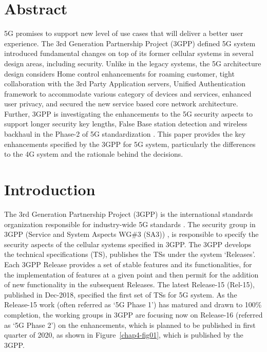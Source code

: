 \begin{multicols}{2}

\section*{Abstract}

5G promises to support new level of use cases that will deliver a better user experience. The 3rd Generation Partnership Project (3GPP) \cite{art4-key01} defined 5G system introduced fundamental changes on top of its former cellular systems in several design areas, including security. Unlike in the legacy systems, the 5G architecture design considers Home control enhancements for roaming customer, tight collaboration with the 3rd Party Application servers, Unified Authentication framework to accommodate various category of devices and services, enhanced user privacy, and secured the new service based core network architecture. Further, 3GPP is investigating the enhancements to the 5G security aspects to support longer security key lengths, False Base station detection and wireless backhaul in the Phase-2 of 5G standardization \cite{art4-key02}. This paper provides the key enhancements specified by the 3GPP for 5G system, particularly the differences to the 4G system and the rationale behind the decisions.

\section{Introduction}

The 3rd Generation Partnership Project (3GPP) is the international standards organization responsible for industry-wide 5G standards \cite{art4-key01}. The security group in 3GPP (Service and System Aspects WG\#3 (SA3)) \cite{art4-key02}, is responsible to specify the security aspects of the cellular systems specified in 3GPP. The 3GPP develops the technical specifications (TS), publishes the TSs under the system ‘Releases’. Each 3GPP Release provides a set of stable features and its functionalities, for the implementation of features at a given point and then permit for the addition of new functionality in the subsequent Releases. The latest Release-15 (Rel-15), published in Dec-2018, specified the first set of TSs for 5G system. As the Release-15 work (often referred as ‘5G Phase 1’) has matured and drawn to 100\% completion, the working groups in 3GPP are focusing now on Release-16 (referred as ‘5G Phase 2’) on the enhancements, which is planned to be published in first quarter of 2020, as shown in Figure~\ref{chap4-fig01}, which is published by the 3GPP\cite{art4-key01}.


\end{multicols}
